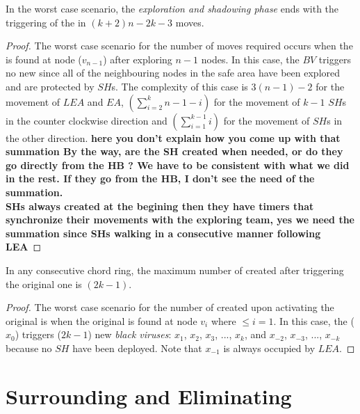 \begin{theorem}
In the worst case scenario, the {\em exploration and shadowing phase}
ends with the triggering of the \bv in $(k+2)n-2k-3$ moves.
\end{theorem}
\begin{proof}
The worst case scenario for the number of moves required occurs when the \bv  is found at node ($v_{n-1}$) after exploring $n-1$ nodes.  
  In this case, the $BV$ triggers no new \bvs since all of the neighbouring nodes in the safe area have been explored and are protected by $SH$s.
The complexity of this case is  $3(n-1)-2$ for the movement of $LEA$ and $EA$, $(\sum\limits_{i=2}^k n-1-i)$ for the movement of $k-1$ $SH$s in the counter clockwise direction and $(\sum\limits_{i=1}^{k-1}i)$ for the movement of  $SH$s in the other direction.
{\bf here you don't explain how you come up with that summation By the way, are the SH created when needed, or do they go directly from the HB ? We have to be consistent with what we did in the rest. If they go from the HB, I don't see the need of the summation.}\\
{\bf  SHs always created at the begining then they have timers that synchronize their movements with the exploring team, yes we need the summation since SHs walking in a consecutive manner following LEA}
\end{proof}
%

%
\begin{theorem}
In any consecutive chord ring, the maximum number of \bvs created after triggering the original one is $(2k-1)$.

\end{theorem}

\begin{proof}
The worst case scenario for the number of \bvs created upon activating the original \bv is when the original is found at node $v_i$ where $\leq i =1$. In this case, the \bv ($x_0$)  triggers ($2k-1$) new {\it black viruses}:  $x_1$, $x_2$, $x_3$, ..., $x_k$, and  $x_{-2}$, $x_{-3}$, ..., $x_{-k}$ because no $SH$ have been deployed. Note that  $x_{-1} $ is always occupied by $LEA$.

\end{proof}








\section{Surrounding and Eliminating}


